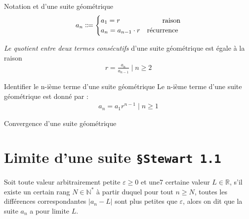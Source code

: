 \documentclass[16pt]{report}
\begin{document}
\begin{multicols*}{2}
        \begin{Syntaxe}{Notation et d'une suite géométrique}{}
        \begin{align*}
                a_n \Coloneqq 
                \begin{cases}
                    a_1 = r  &\omit\hfill raison\\  
                    a_{n} = a_{n-1} \cdot r &\omit\hfill récurrence
                \end{cases}
        \end{align*}

    \end{Syntaxe}


    \begin{note}{}{}
      \textit{Le quotient entre deux termes consécutifs} d'une suite 
      géométrique est égale à la raison 
      \begin{align*}
        r = \frac{a_n}{a_{n-1}} \; | \; n \geq 2
      \end{align*}
    \end{note}


    \begin{Concept}{Identifier le n-ième terme d'une suite géométrique}{}
        Le n-ième terme d'une suite géométrique est donné par : \\
        \begin{align*}
        a_n = a_1r^{n - 1} \; | \; n \geq 1
      \end{align*}
    \end{Concept}

    \begin{Theorem}{Convergence d'une suite géométrique}{}
        
    \end{Theorem}

    \section{Limite d'une suite \quad \texttt{\S Stewart 1.1}  }

    \paragraph{}
    Soit toute valeur arbitrairement petite $\varepsilon \geq 0$ et une7 
    certaine valeur $L \in \mathbb{R}$, s'il 
    existe un certain rang $N \in \mathbb{N}^{*}$ à partir duquel 
    pour tout $n \geq N$, toutes les différences correspondantes 
    $|a_n - L|$ sont plus petites que $\varepsilon$, alors on dit que 
    la suite $a_n$ a pour limite $L$. 



\end{multicols*}
\end{document}
